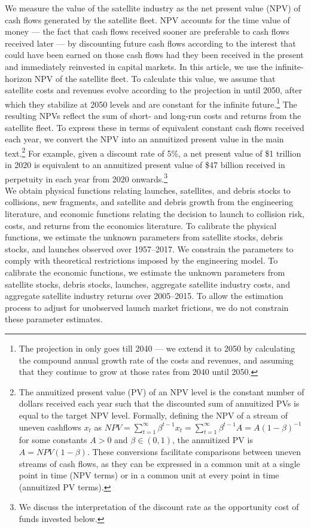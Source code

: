 \documentclass[9pt,twoside,lineno]{pnas-new}
\begin{document}
We measure the value of the satellite industry as the net present value (NPV) of cash flows generated by the satellite fleet. NPV accounts for the time value of money --- the fact that cash flows received sooner are preferable to cash flows received later --- by discounting future cash flows according to the interest that could have been earned on those cash flows had they been received in the present and immediately reinvested in capital markets. In this article, we use the infinite-horizon NPV of the satellite fleet. To calculate this value, we assume that satellite costs and revenues evolve according to the projection in \citet{MSreport} until 2050, after which they stabilize at 2050 levels and are constant for the infinite future.\footnote{The projection in \citet{MSreport} only goes till 2040 --- we extend it to 2050 by calculating the compound annual growth rate of the costs and revenues, and assuming that they continue to grow at those rates from 2040 until 2050.} The resulting NPVs reflect the sum of short- and long-run costs and returns from the satellite fleet. To express these in terms of equivalent constant cash flows received each year, we convert the NPV into an annuitized present value in the main text.\footnote{The annuitized present value (PV) of an NPV level is the constant number of dollars received each year such that the discounted sum of annuitized PVs is equal to the target NPV level. Formally, defining the NPV of a stream of uneven cashflows $x_t$ as $NPV = \sum_{t=1}^{\infty} \beta^{t-1} x_t = \sum_{t=1}^{\infty} \beta^{t-1} A = A(1 - \beta)^{-1}$ for some constants $A>0$ and $\beta \in (0,1)$, the annuitized PV is $A = NPV(1-\beta)$. These conversions facilitate comparisons between uneven streams of cash flows, as they can be expressed in a common unit at a single point in time (NPV terms) or in a common unit at every point in time (annuitized PV terms).}  For example, given a discount rate of 5\%, a net present value of \$1 trillion in 2020 is equivalent to an annuitized present value of \$47 billion received in perpetuity in each year from 2020 onwards.\footnote{We discuss the interpretation of the discount rate as the opportunity cost of funds invested below.} \\

We obtain physical functions relating launches, satellites, and debris stocks to collisions, new fragments, and satellite and debris growth from the engineering literature, and economic functions relating the decision to launch to collision risk, costs, and returns from the economics literature. To calibrate the physical functions, we estimate the unknown parameters from satellite stocks, debris stocks, and launches observed over 1957--2017. We constrain the parameters to comply with theoretical restrictions imposed by the engineering model. To calibrate the economic functions, we estimate the unknown parameters from satellite stocks, debris stocks, launches, aggregate satellite industry costs, and aggregate satellite industry returns over 2005--2015. To allow the estimation process to adjust for unobserved launch market frictions, we do not constrain these parameter estimates. 
\end{document}
